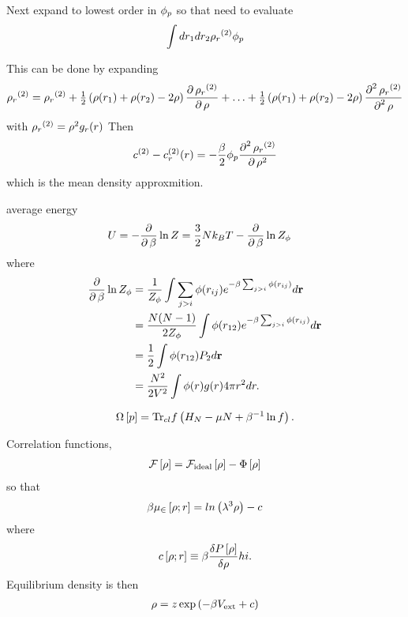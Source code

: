 Next expand to lowest order in ${\phi_p}$
so that need to evaluate
\begin{align}
  \int dr_1 dr_2 {\rho_r}^{(2)} \phi_p
\end{align}

This can be done by expanding 
\begin{align}
  {\rho_r}^{(2)} = {\rho_r}^{(2)} + \tfrac{1}{2} \left( \rho(r_1)  + \rho(r_2) - 2\rho  \right) \frac{\operatorname{\partial} {\rho_r}^{(2)}}{\operatorname{\partial}\rho} + \ldots + \tfrac{1}{2} \left( \rho(r_1)  + \rho(r_2) - 2\rho  \right) \frac{\operatorname{\partial}^2 {\rho_r}^{(2)}}{\operatorname{\partial}^2\rho}
\end{align}
with ${\rho_r}^{(2)}=\rho^2 g_r(r)$
Then
\begin{align}
  c^{(2)} - c_r^{(2)}(r) = -\frac{\beta}{2} {\phi_p} \frac{\operatorname{\partial}^2 {\rho_r}^{(2)}}{\operatorname{\partial}\rho^2}
\end{align}
which is the mean density approxmition.


average energy 
\begin{align}
  U &= - \frac{\operatorname{\partial}}{\operatorname{\partial}\beta} \ln Z = \frac{3}{2}Nk_B T -  \frac{\operatorname{\partial}}{\operatorname{\partial}\beta}\ln Z_\phi
\end{align}
where
\begin{align}
   \frac{\operatorname{\partial}}{\operatorname{\partial}\beta}\ln Z_\phi &= \frac{1}{Z_\phi} \int \sum_{j>i} \phi(r_{ij})e^{-\beta \sum_{j>i} \phi(r_{ij})} d{\mathbf{\textbf{r}}}\\
   &= \frac{N(N-1)}{2 Z_\phi} \int \phi(r_{12}) e^{-\beta \sum_{j>i} \phi(r_{ij})} d{\mathbf{\textbf{r}}}\\
   &= \frac{1}{2} \int \phi(r_{12}) P_2 d{\mathbf{\textbf{r}}}\\
   &= \frac{N^2}{2V^2} \int \phi(r)g(r)4\pi r^2 dr.
\end{align}


\begin{align}
  \Omega\left[ p \right] = \textrm{Tr}_{cl} f\left( H_N - \mu N + \beta^{-1} \ln f \right).
\end{align}


Correlation functions,
\begin{align}
  {\cal F}\left[ \rho \right] = {\cal F}_{\text{ideal}}\left[ \rho \right] - \Phi\left[ \rho \right]
\end{align}
so that
\begin{align}
  \beta \mu_\in \left[ \rho;r \right] = ln \left( \lambda^3 \rho \right) - c
\end{align}
where
\begin{align}
  c \left[ \rho;r \right] \equiv \beta \frac{\delta P\left[ \rho \right]}{\delta \rho}hi.
\end{align}
Equilibrium density is then
\begin{align}
  \rho = z \exp \left( -\beta V_{\text{ext}} + c \right)
\end{align}

